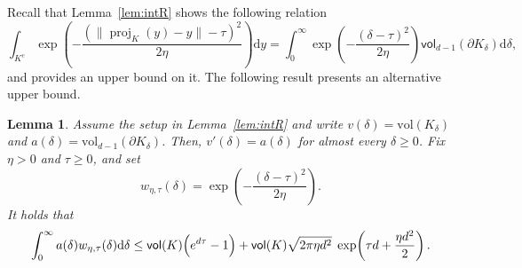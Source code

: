 \documentclass[11pt,letterpaper]{article}
\newcommand{\proj}{\operatorname{proj}}
\newcommand{\D}{\mathrm{d}}
\newcommand{\vol}{\mathsf{vol}}
\newcommand{\brac}[1]{\left( #1\right)}
\newtheorem{lemma}[thm]{Lemma}
\begin{document}

Recall that Lemma~\ref{lem:intR} shows the following relation
\[
\int_{K^c} \exp\left(-\frac{\brac{\|\proj_K(y)-y\|-\tau}^2}{2\eta}\right) \D y=\int_0^\infty \exp\left(-\frac{\brac{\delta-\tau}^2}{2\eta}\right) \vol_{d-1}(\partial K_\delta) \D \delta,
\]
and provides an upper bound on it.
The following result presents an alternative upper bound.


\begin{lemma}
\label{lem:alternativeintbypart}
Assume the setup in Lemma~\ref{lem:intR} and write $v(\delta)= \mathrm{vol}(K_\delta)$ and $a(\delta) = \mathrm{vol}_{d-1}(\partial K_\delta)$. Then, $v'(\delta)=a(\delta)$ for almost every
$\delta\ge 0$.
Fix $\eta>0$ and $\tau\ge 0$, and set
\[
  w_{\eta,\tau}(\delta)
  = \exp\!\left(-\frac{(\delta-\tau)^2}{2\eta}\right).
\]
It holds that
\[
\int_0^\infty a(\delta) w_{\eta,\tau}(\delta) \D\delta
\le
\vol(K)\Bigl(e^{d\tau}-1\Bigr)
+
\vol(K)\sqrt{2\pi\eta d^2}\;
\exp\!\left(\tau d+\frac{\eta d^2}{2}\right).
\]
\end{lemma}
\end{document}

